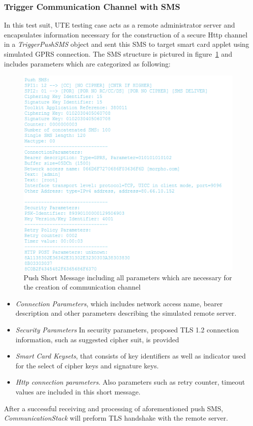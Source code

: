 \subsubsection{Trigger Communication Channel with SMS} \label{secAppletTest1}
In this test suit, UTE testing case acts as a remote administrator server and encapsulates information necessary for the construction of a secure Http channel in a \emph{TriggerPushSMS} object and sent this SMS to target smart card applet using simulated GPRS connection. The SMS structure is pictured in figure~\ref{fig:push-sms} and includes parameters which are categorized as following:
\begin{figure}[!htb]
	\centering
	\includegraphics[width=1.0\textwidth]{Images/impl/push-sms.png}
		\caption{Push Short Message including all parameters which are necessary for the creation of communication channel}
	\label{fig:push-sms}
\end{figure}
\begin{itemize}
\item \emph{Connection Parameters}, which includes network access name, bearer description and other parameters describing the simulated remote server.
\item \emph{Security Parameters} In security parameters, proposed TLS 1.2 connection information, such as suggested cipher suit, is provided
\item \emph{Smart Card Keysets}, that consists of key identifiers as well as indicator used for the select of cipher keys and signature keys.
\item \emph{Http connection parameters}. Also parameters such as retry counter, timeout values are included in this short message.
\end{itemize}
After a successful receiving and processing of aforementioned push SMS, \emph{CommunicationStack} will preform TLS handshake with the remote server. 


